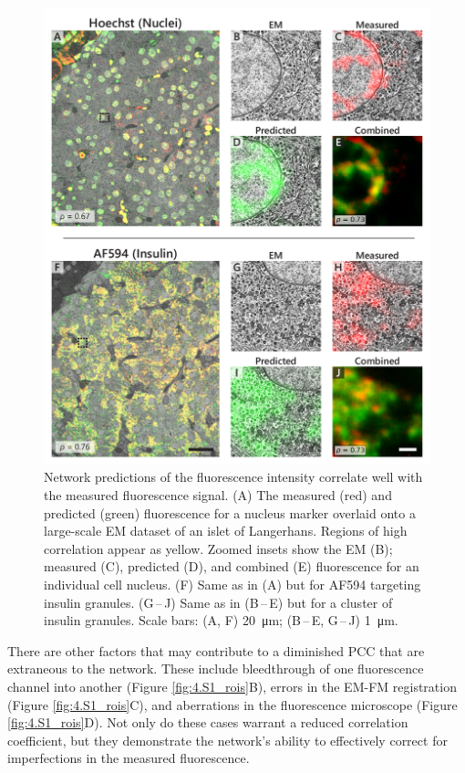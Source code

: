 \begin{figure}[!tb]
    \centering
    \includegraphics[width=\linewidth]{chapter-4/figures_PDF/fig4-2_pancreas.pdf}
    \caption{Network predictions of the fluorescence intensity correlate well with the measured fluorescence signal.
    (A) The measured (red) and predicted (green) fluorescence for a nucleus marker overlaid onto a large-scale EM dataset of an islet of Langerhans. Regions of high correlation appear as yellow. 
    Zoomed insets show the EM (B); measured (C), predicted (D), and combined (E) fluorescence for an individual cell nucleus.
    (F) Same as in (A) but for AF594 targeting insulin granules.
    (G\,--\,J) Same as in (B\,--\,E) but for a cluster of insulin granules.
    Scale bars: (A, F) \SI{20}{\micro\meter}; (B\,--\,E, G\,--\,J) \SI{1}{\micro\meter}.}
    \label{fig:4.2_pancreas}
\end{figure}

There are other factors that may contribute to a diminished PCC that are extraneous to the network. These include bleedthrough of one fluorescence channel into another (Figure \ref{fig:4.S1_rois}B), errors in the EM-FM registration (Figure \ref{fig:4.S1_rois}C), and aberrations in the fluorescence microscope (Figure \ref{fig:4.S1_rois}D). Not only do these cases warrant a reduced correlation coefficient, but they demonstrate the network's ability to effectively correct for imperfections in the measured fluorescence.



